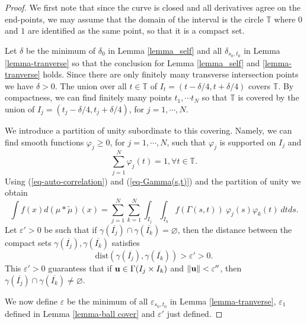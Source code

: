 \documentclass[10pt,a4paper]{amsart}
\newcommand{\wt}[1]{\widetilde{#1}}
\begin{document}
\begin{proof}
We first note that {since the} curve is closed and all derivatives agree on the end-points, we may assume that the domain of the interval is the circle ${\mathbb T}$ where $0$ and $1$ are identified as the same point, so that it is a compact set.


    Let $\delta$ be the minimum of $\delta_0$ in Lemma \ref{lemma_self} and all $\delta_{s_0,t_0}$ in Lemma \ref{lemma-tranverse} so that the conclusion for Lemma \ref{lemma_self} and \ref{lemma-tranverse} holds. Since there are only finitely many transverse intersection points {we have} $\delta>0$.  {The union over} all $t\in {\mathbb T}$ {of} $I_t = (t-\delta/4,t+\delta/4)$ covers ${\mathbb T}$. By compactness, we can find finitely many points $t_1,\cdots t_N$ so that ${\mathbb T}$ is covered by {the union of} $I_j = (t_j-\delta/4,t_j+\delta/4)$, {for} $j=1,\cdots, N$. 

     {We introduce a partition of unity subordinate to this covering.} Namely, we can find smooth functions $\varphi_j{\ge 0}$, for $j = 1,\cdots,N$, such that $\varphi_j$ is supported on $I_j$ and 
     $$
     \sum_{j=1}^N \varphi_j(t) = 1, \forall t\in {\mathbb T}.
     $$
Using (\ref{eq-auto-correlation}) and (\ref{eq-Gamma(s,t)}) and the partition of unity {we obtain}
\begin{equation}\label{eq-partition-unity}
\int f(x)d(\mu\ast\wt{\mu})(x) = \sum_{j=1}^N\sum_{k=1}^N\int_{I_j}\int_{I_k} f(\Gamma(s,t))~\varphi_j(s)\varphi_k(t)~dtds.
\end{equation}
Let $\varepsilon'>0$ be such that if $\gamma(\overline{I_j})\cap \gamma(\overline{I_k}) = \varnothing$, then the distance between the compact sets $\gamma(\overline{I_j}), \gamma(\overline{I_k})$ {satisfies}
$$
\mbox{dist} (\gamma(\overline{I_j}), \gamma(\overline{I_k})) >\varepsilon'>0.
$$
This $\varepsilon'>0$ guarantess that if ${\bf u}\in \Gamma(I_j\times I_k)$ and $\|{\bf u}\|<\varepsilon''$, then $\gamma(\overline{I_j})\cap \gamma(\overline{I_k}) \ne  \varnothing$. 

We now define $\varepsilon$ be the minimum of all $\varepsilon_{s_0,t_0}$ in Lemma {\ref{lemma-tranverse}},  {$\varepsilon_1$} defined in Lemma \ref{lemma-ball cover} and $\varepsilon'$ just defined. 



\end{proof}
\end{document}
